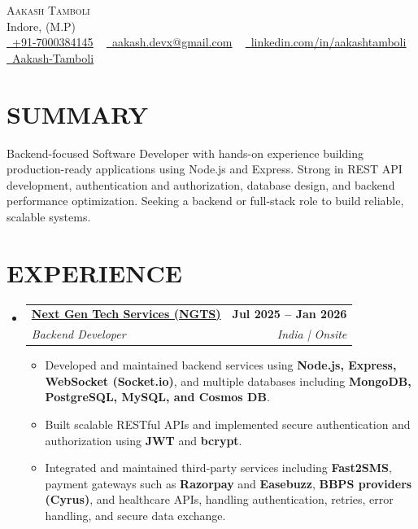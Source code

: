 \documentclass[letterpaper,11pt]{article}
\makeatletter
\newcommand{\resumeItem}[1]{\item\small{{#1 \vspace{-2pt}}}}
\newcommand{\resumeSubheading}[4]{
  \vspace{-2pt}\item
  \begin{tabular*}{1.0\textwidth}[t]{l@{\extracolsep{\fill}}r}
    \textbf{\large#1} & \textbf{\small #2} \\
    \textit{\large#3} & \textit{\small #4} \\
  \end{tabular*}\vspace{-7pt}
}
\newcommand{\resumeItemListStart}{\begin{itemize}}
\newcommand{\resumeItemListEnd}{\end{itemize}\vspace{-5pt}}
\newcommand{\resumeSubHeadingListStart}{\begin{itemize}[leftmargin=0.0in, label={}]}
\newcommand{\resumeSubHeadingListEnd}{\end{itemize}}
\makeatother
\begin{document}
\begin{center}
  {\Huge \scshape Aakash Tamboli} \\ \vspace{1pt}
  Indore, (M.P) \\ \vspace{1pt}
  \small
  \href{tel:+7000384145}{\faPhone\ \underline{+91-7000384145}} ~
  \href{mailto:aakash.devx@gmail.com}{\faEnvelope\ \underline{aakash.devx@gmail.com}} ~
  \href{https://www.linkedin.com/in/aakashtamboli/}{\faLinkedin\ \underline{linkedin.com/in/aakashtamboli}} ~
  \href{https://github.com/Aakash-Tamboli}{\faGithub\ \underline{Aakash-Tamboli}}
\end{center}

\section{SUMMARY}
Backend-focused Software Developer with hands-on experience building production-ready applications using Node.js and Express. Strong in REST API development, authentication and authorization, database design, and backend performance optimization. Seeking a backend or full-stack role to build reliable, scalable systems.



\section{EXPERIENCE}
\resumeSubHeadingListStart

\resumeSubheading
  {\href{https://www.ngtsindore.com/}{Next Gen Tech Services (NGTS)}}{Jul 2025 -- Jan 2026}
  {Backend Developer}{India | Onsite}
\vspace{-4pt}
\resumeItemListStart
  \resumeItem{Developed and maintained backend services using \textbf{Node.js, Express, WebSocket (Socket.io)}, and multiple databases including \textbf{MongoDB, PostgreSQL, MySQL, and Cosmos DB}.}
  \resumeItem{Built scalable RESTful APIs and implemented secure authentication and authorization using \textbf{JWT} and \textbf{bcrypt}.}
  \resumeItem{Integrated and maintained third-party services including \textbf{Fast2SMS}, payment gateways such as \textbf{Razorpay} and \textbf{Easebuzz}, \textbf{BBPS providers (Cyrus)}, and healthcare APIs, handling authentication, retries, error handling, and secure data exchange.}
\resumeItemListEnd


\resumeSubHeadingListEnd
\end{document}
